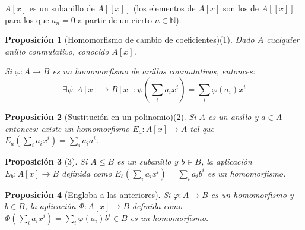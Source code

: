 \documentclass[11pt, a4paper, titlepage]{article}
\theoremstyle{theorem-style}
\newtheorem*{nprop}{Proposición}
\theoremstyle{definition-style}
\theoremstyle{remark-style}
\theoremstyle{example-style}
\begin{document}
$A[x]$ es un subanillo de $A[[x]]$ (los elementos de $A[x]$ son los de $A[[x]]$ para los que $a_n = 0$ a partir de un cierto $n\in \mathbb{N}$).

\begin{nprop}[Homomorfismo de cambio de coeficientes)(1]
 Dado $A$ cualquier anillo conmutativo, conocido $A[x]$.
 
 Si $\varphi:A \to B$ es un homomorfismo de anillos conmutativos, entonces:
 \[
 \exists \psi: A[x] \to B[x] : \psi\left(\sum_i a_i x^i\right) = \sum_i\varphi(a_i) x^i
 \]

	
\end{nprop}

\begin{nprop}[Sustitución en un polinomio)(2]
	
Si $A$ es un anillo y $a \in A$ entonces: existe un homomorfismo $E_a: A[x] \to A$ tal que $E_a(\sum_i a_i x^i) = \sum_i a_i a^i$.
	
\end{nprop}

\begin{nprop}[3]
Si $A \leq B$ es un subanillo y $b\in B$, la aplicación $E_b:A[x] \to B$ definida como $E_b(\sum_i a_i x^i) = \sum_i a_i b^i$ es un homomorfismo.
	
\end{nprop}

\begin{nprop}[Engloba a las anteriores]
Si $\varphi:A \to B$ es un homomorfismo y $b\in B$, la aplicación $\Phi:A[x] \to B$ definida como $\Phi ( \sum_i a_i x^i) = \sum_i \varphi(a_i)b^i \in B$ es un homomorfismo.

\end{nprop}
\end{document}
